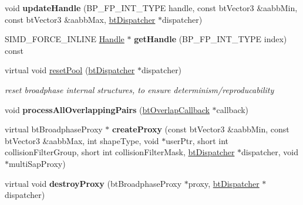 \begin{DoxyCompactItemize}
\mbox{\label{classbtAxisSweep3Internal_ac9852514d20572ebdde3e72215b09410}} 
void {\bfseries update\+Handle} (B\+P\+\_\+\+F\+P\+\_\+\+I\+N\+T\+\_\+\+T\+Y\+PE handle, const bt\+Vector3 \&aabb\+Min, const bt\+Vector3 \&aabb\+Max, \hyperlink{classbtDispatcher}{bt\+Dispatcher} $\ast$dispatcher)
\item 
\mbox{\label{classbtAxisSweep3Internal_a7b5d56d6783b872714158a0f90cbd1da}} 
S\+I\+M\+D\+\_\+\+F\+O\+R\+C\+E\+\_\+\+I\+N\+L\+I\+NE \hyperlink{classbtAxisSweep3Internal_1_1Handle}{Handle} $\ast$ {\bfseries get\+Handle} (B\+P\+\_\+\+F\+P\+\_\+\+I\+N\+T\+\_\+\+T\+Y\+PE index) const
\item 
\mbox{\label{classbtAxisSweep3Internal_a579f1edcfac9fa9d6d86a2376baee6ce}} 
virtual void \hyperlink{classbtAxisSweep3Internal_a579f1edcfac9fa9d6d86a2376baee6ce}{reset\+Pool} (\hyperlink{classbtDispatcher}{bt\+Dispatcher} $\ast$dispatcher)
\begin{DoxyCompactList}\small\item\em reset broadphase internal structures, to ensure determinism/reproducability \end{DoxyCompactList}\item 
\mbox{\label{classbtAxisSweep3Internal_adc81ed36fde6cccd3e9fcb2ec3bc759c}} 
void {\bfseries process\+All\+Overlapping\+Pairs} (\hyperlink{structbtOverlapCallback}{bt\+Overlap\+Callback} $\ast$callback)
\item 
\mbox{\label{classbtAxisSweep3Internal_a479bf8cdb5aaa134f8c35d1ef1b8106a}} 
virtual bt\+Broadphase\+Proxy $\ast$ {\bfseries create\+Proxy} (const bt\+Vector3 \&aabb\+Min, const bt\+Vector3 \&aabb\+Max, int shape\+Type, void $\ast$user\+Ptr, short int collision\+Filter\+Group, short int collision\+Filter\+Mask, \hyperlink{classbtDispatcher}{bt\+Dispatcher} $\ast$dispatcher, void $\ast$multi\+Sap\+Proxy)
\item 
\mbox{\label{classbtAxisSweep3Internal_a740a753513babe140440f3c5612d2630}} 
virtual void {\bfseries destroy\+Proxy} (bt\+Broadphase\+Proxy $\ast$proxy, \hyperlink{classbtDispatcher}{bt\+Dispatcher} $\ast$dispatcher)
\item 

\end{DoxyCompactItemize}
